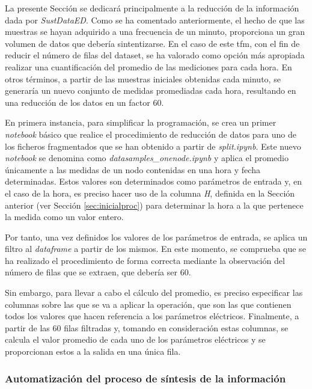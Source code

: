 La presente Sección se dedicará principalmente a la reducción de la información dada por \textit{SustDataED}. Como se ha comentado anteriormente, el hecho de que las muestras se hayan adquirido a una frecuencia de un minuto, proporciona un gran volumen de datos que debería sintentizarse. En el caso de este \gls{tfm}, con el fin de reducir el número de filas del dataset, se ha valorado como opción más apropiada realizar una cuantificación del promedio de las mediciones para cada hora. En otros términos, a partir de las muestras iniciales obtenidas cada minuto, se generaría un nuevo conjunto de medidas promediadas cada hora, resultando en una reducción de los datos en un factor 60.

\vspace{3mm}

En primera instancia, para simplificar la programación, se crea un primer \textit{notebook} básico que realice el procedimiento de reducción de datos para uno de los ficheros fragmentados que se han obtenido a partir de \textit{split.ipynb}. Este nuevo \textit{notebook} se denomina como \textit{datasamples\_onenode.ipynb} y aplica el promedio únicamente a las medidas de un nodo contenidas en una hora y fecha determinadas. Estos valores son determinados como parámetros de entrada y, en el caso de la hora, es preciso hacer uso de la columna \textit{H}, definida en la Sección anterior (ver Sección \ref{sec:inicialproc}) para determinar la hora a la que pertenece la medida como un valor entero.

\vspace{3mm}

Por tanto, una vez definidos los valores de los parámetros de entrada, se aplica un filtro al \textit{dataframe} a partir de los mismos. En este momento, se comprueba que se ha realizado el procedimiento de forma correcta mediante la observación del número de filas que se extraen, que debería ser 60. 

\vspace{3mm}

Sin embargo, para llevar a cabo el cálculo del promedio, es preciso especificar las columnas sobre las que se va a aplicar la operación, que son las que contienen todos los valores que hacen referencia a los parámetros eléctricos. Finalmente, a partir de las 60 filas filtradas y, tomando en consideración estas columnas, se calcula el valor promedio de cada uno de los parámetros eléctricos y se proporcionan estos a la salida en una única fila.

\subsubsection{Automatización del proceso de síntesis de la información}
\label{sec:datasamples}

